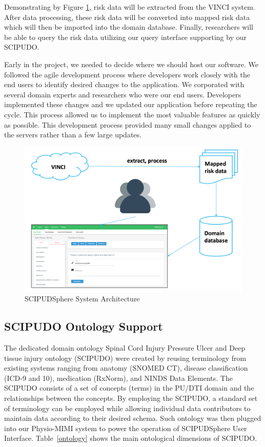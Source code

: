 \documentclass{amia}
\begin{document}
Demonstrating by Figure \ref{architecture}, risk data will be extracted from the VINCI system. After data processing, these risk data will be converted into mapped risk data which will then be imported into the domain database. Finally, researchers will be able to query the risk data utilizing our query interface supporting by our SCIPUDO. 

Early in the project, we needed to decide where we should host our software. We followed the agile development process where developers work closely with the end users to identify desired changes to the application. We corporated with several domain experts and researchers who were our end users. Developers implemented these changes and we updated our application before repeating the cycle. This process allowed us to implement the most valuable features as quickly as possible. This development process provided many small changes applied to the servers rather than a few large updates.

\begin{figure}[h!]
  \centering
  \includegraphics[scale=0.4]{pics/architecture.png}
  \caption{SCIPUDSphere System Architecture}
  \label{architecture}
\end{figure}


\subsection{SCIPUDO Ontology Support}
The dedicated domain ontology Spinal Cord Injury Pressure Ulcer and Deep tissue injury ontology (SCIPUDO) were created by reusing terminology from existing systems ranging from anatomy (SNOMED CT), disease classification (ICD-9 and 10), medication (RxNorm), and NINDS Data Elements. The SCIPUDO consists of a set of concepts (terms) in the PU/DTI domain and the relationships between the concepts. By employing the SCIPUDO, a standard set of terminology can be employed while allowing individual data contributors to maintain data according to their desired schema. Such ontology was then plugged into our Physio-MIMI system to power the operation of SCIPUDSphere User Interface. Table~\ref{ontology} shows the main ontological dimensions of SCIPUDO. 
\end{document}
